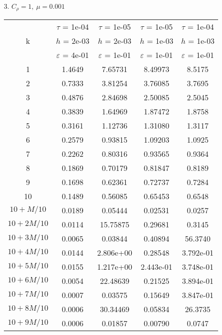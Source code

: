 3. $C_{\rho} = 1, \ \mu = 0.001$
\begin{center}
	\begin{tabular}{ |c|c|c|c|c| } 
		\hline
		& $\tau$ = 1e-04 & $\tau$ = 1e-05 & $\tau$ = 1e-05 & $\tau$ = 1e-04 \\ 
		k & $h$ = 2e-03 & $h$ = 2e-03 & $h$ = 1e-03 & $h$ = 1e-03 \\ 
		& $\varepsilon$ = 4e-01 & $\varepsilon$ = 1e-01 & $\varepsilon$ = 1e-01 & $\varepsilon$ = 1e-01 \\ 
		\hline
		1 & 1.4649 & 7.65731 & 8.49973 & 8.5175 \\
		\hline
		2 & 0.7333 & 3.81254 & 3.76085 & 3.7695 \\
		\hline
		3 & 0.4876 & 2.84698 & 2.50085 & 2.5045 \\
		\hline
		4 & 0.3839 & 1.64969 & 1.87472 & 1.8758 \\
		\hline
		5 & 0.3161 & 1.12736 & 1.31080 & 1.3117 \\
		\hline
		6 & 0.2579 & 0.93815 & 1.09203 & 1.0925 \\
		\hline
		7 & 0.2262 & 0.80316 & 0.93565 & 0.9364 \\
		\hline
		8 & 0.1869 & 0.70179 & 0.81847 & 0.8189 \\
		\hline
		9 & 0.1698 & 0.62361 & 0.72737 & 0.7284 \\
		\hline
		10 & 0.1489 & 0.56085 & 0.65453 & 0.6548 \\
		\hline
		$10 + M/10$ & 0.0189 & 0.05444 & 0.02531 & 0.0257 \\
		\hline
		$10 + 2M/10$ & 0.0114 & 15.75875 & 0.29681 & 0.3145 \\
		\hline
		$10 + 3M/10$ & 0.0065 & 0.03844 & 0.40894 & 56.3740 \\
		\hline
		$10 + 4M/10$ & 0.0144 & 2.806e+00 & 0.28548 & 3.792e-01 \\
		\hline
		$10 + 5M/10$ & 0.0155 & 1.217e+00 & 2.443e-01 & 3.748e-01 \\
		\hline
		$10 + 6M/10$ & 0.0054 & 22.48639 & 0.21525 & 3.894e-01 \\
		\hline
		$10 + 7M/10$ & 0.0007 & 0.03575 & 0.15649 & 3.847e-01 \\
		\hline
		$10 + 8M/10$ & 0.0006 & 30.34469 & 0.05834 & 26.3735 \\
		\hline
		$10 + 9M/10$ & 0.0006 & 0.01857 & 0.00790 & 0.0747 \\
		\hline
	\end{tabular}
\end{center}

